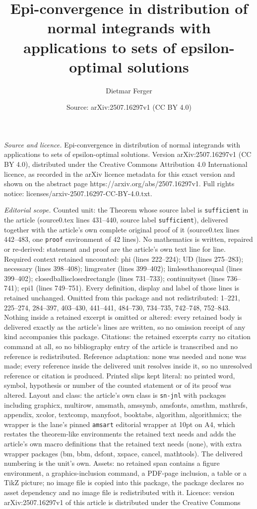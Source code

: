 \documentclass[10pt,a4paper]{amsart}
\title[Epi-convergence in distribution of normal integrands with ap]{Epi-convergence in distribution of normal integrands with applications to sets of epsilon-optimal solutions}
\author{Dietmar Ferger}
\date{Source: arXiv:2507.16297v1 (CC BY 4.0)}
\begin{document}
\maketitle

\noindent\emph{Source and licence.} Epi-convergence in distribution of normal integrands with applications to sets of epsilon-optimal solutions. Version arXiv:2507.16297v1 (CC BY 4.0), distributed under the Creative Commons Attribution 4.0 International licence, as recorded in the arXiv licence metadata for this exact version and shown on the abstract page https://arxiv.org/abs/2507.16297v1. Full rights notice: licenses/arxiv-2507.16297-CC-BY-4.0.txt.\par\smallskip

\noindent\textit{Editorial scope.} Counted unit: the Theorem whose source label is \texttt{sufficient} in the article (source0.tex lines 431--440, source label \texttt{sufficient}), delivered together with the article's own complete original proof of it (source0.tex lines 442--483, one \texttt{proof} environment of 42 lines). No mathematics is written, repaired or re-derived: statement and proof are the article's own text line for line. Required context retained uncounted: phi (lines 222--224); UD (lines 275--283); necessary (lines 398--408); limgreater (lines 399--402); limlessthanorequal (lines 399--402); closedballisclosedrectangle (lines 731--733); continuityset (lines 736--741); epi1 (lines 749--751). Every definition, display and label of those lines is retained unchanged. Omitted from this package and not redistributed: 1--221, 225--274, 284--397, 403--430, 441--441, 484--730, 734--735, 742--748, 752--843. Nothing inside a retained excerpt is omitted or altered: every retained body is delivered exactly as the article's lines are written, so no omission receipt of any kind accompanies this package. Citations: the retained excerpts carry no citation command at all, so no bibliography entry of the article is transcribed and no reference is redistributed. Reference adaptation: none was needed and none was made; every reference inside the delivered unit resolves inside it, so no unresolved reference or citation is produced. Printed slips kept literal: no printed word, symbol, hypothesis or number of the counted statement or of its proof was altered. Layout and class: the article's own class is \texttt{sn-jnl} with packages including graphicx, multirow, amsmath, amssymb, amsfonts, amsthm, mathrsfs, appendix, xcolor, textcomp, manyfoot, booktabs, algorithm, algorithmicx; the wrapper is the lane's pinned \texttt{amsart} editorial wrapper at 10pt on A4, which restates the theorem-like environments the retained text needs and adds the article's own macro definitions that the retained text needs (none), with extra wrapper packages (bm, bbm, dsfont, xspace, cancel, mathtools). The delivered numbering is the unit's own. Assets: no retained span contains a figure environment, a graphics-inclusion command, a PDF-page inclusion, a table or a TikZ picture; no image file is copied into this package, the package declares no asset dependency and no image file is redistributed with it. Licence: version arXiv:2507.16297v1 of this article is distributed under the Creative Commons 
\end{document}

